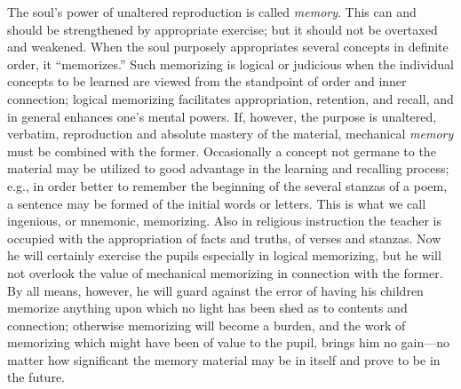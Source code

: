 The soul’s power of unaltered reproduction is called \emph{memory}. This can and should be strengthened by appropriate exercise; but it should not be overtaxed and weakened. When the soul purposely appropriates several concepts in definite order, it “memorizes.” Such memorizing is logical or judicious when the individual concepts to be learned are viewed from the standpoint of order and inner connection; logical memorizing facilitates appropriation, retention, and recall, and in general enhances one’s mental powers. If, however, the purpose is unaltered, verbatim, reproduction and absolute mastery of the material, mechanical \emph{memory} must be combined with the former. Occasionally a concept not germane to the material may be utilized to good advantage in the learning and recalling process; e.g., in order better to remember the beginning of the several stanzas of a poem, a sentence may be formed of the initial words or letters. This is what we call ingenious, or mnemonic, memorizing. Also in religious instruction the teacher is occupied with the appropriation of facts and truths, of verses and stanzas. Now
he will certainly exercise the pupils especially in logical memorizing, but he will not overlook the value of mechanical memorizing in connection with the former. By all means, however, he will guard against the error of having his children memorize anything upon which no light has been shed as to contents and connection; otherwise memorizing will become a burden, and the work of memorizing which might have been of value to the pupil, brings him no gain—no matter how significant the memory material may be in itself and prove to be in the future.

